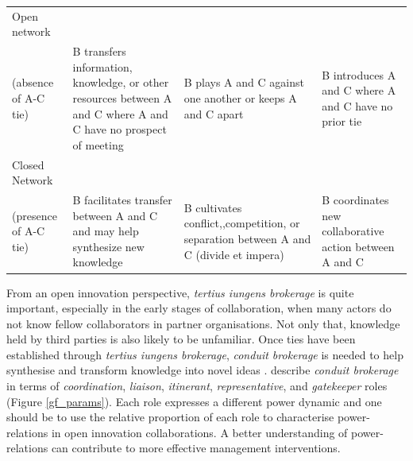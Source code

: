 {{\begin{table}[]
\begin{tabularx}{\textwidth}{p{3.5cm}p{3.5cm}p{3.5cm}p{3.5cm}}
	Open network\\(absence of A-C tie) & B transfers information, knowledge, or other resources between A and C where A and C have no prospect of meeting & B plays A and C against one another or keeps A and C apart & B introduces A and C where A and C have no prior tie \\ \midrule
	Closed Network\\(presence of A-C tie) & B facilitates transfer between A and C and may help synthesize new knowledge & B cultivates conflict,,competition, or separation between A and C (divide et impera) & B coordinates new collaborative action between A and C \\ \bottomrule
\end{tabularx}
\end{table}

From an open innovation perspective, \emph{tertius iungens brokerage} is quite important, especially in the early stages of collaboration, when many actors do not know fellow collaborators in partner organisations. Not only that, knowledge held by third parties is also likely to be unfamiliar. Once ties have been established through \emph{tertius iungens brokerage}, \emph{conduit brokerage} is needed to help synthesise and transform knowledge into novel ideas \citep{fleming2007collaborative,lingo2010nexus,quintane2016brokers}. \citet{gould1989structures} describe \emph{conduit brokerage} in terms of \emph{coordination}, \emph{liaison}, \emph{itinerant}, \emph{representative}, and \emph{gatekeeper} roles (Figure \ref{gf_params}). Each role expresses a different power dynamic and one should be to use the relative proportion of each role to characterise power-relations in open innovation collaborations. A better understanding of power-relations can contribute to more effective management interventions. 

}}
